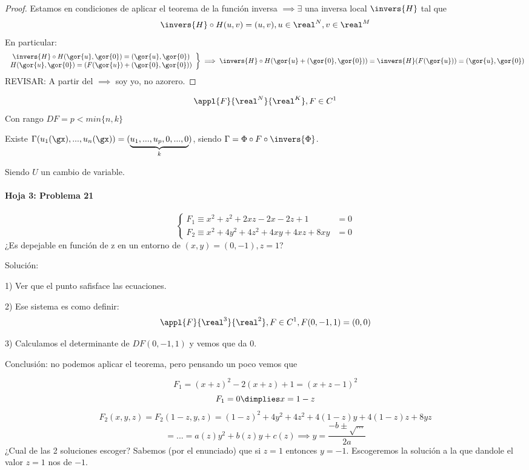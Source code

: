 \begin{proof}
Estamos en condiciones de aplicar el teorema de la función inversa $ \implies \exists$ una inversa local $\invers{H}$ tal que
\[\invers{H} \circ H(u,v) = (u,v), u\in \real^N,v\in\real^M\]
En particular:
\[\left. \begin{array}{c} \invers{H} \circ H (\gor{u},\gor{0}) = (\gor{u},\gor{0})\\
H(\gor{u},\gor{0}) = (F(\gor{u}) + (\gor{0}, \gor{0})) \end{array} \right\} \implies \invers{H} \circ H(\gor{u}+(\gor{0},\gor{0})) = \invers{H}(F(\gor{u})) = (\gor{u},\gor{0})\]
REVISAR: A partir del $\implies$ soy yo, no azorero.
\end{proof}

\begin{theorem}
\[\appl{F}{\real^N}{\real^K}, F\in C^1\]
Con rango $DF = p < min\{n,k\}$

Existe $\Gamma (u_1(\gx),...,u_n(\gx)) = (\underbrace{u_1,...,u_p,0,...,0}_{k})$, siendo $\Gamma = \Phi \circ F \circ \invers{\Phi}$.
 
 Siendo $U$ un cambio de variable.
\end{theorem}

\paragraph{Hoja 3: Problema 21}

\[\left\{\begin{array}{cc}
   F_1\equiv x^2+z^2+2xz-2x-2z+1&=0\\
   F_2\equiv x^2+4y^2+4z^2+4xy+4xz+8xy&=0
  \end{array}\right.\]
  ¿Es depejable en función de z en un entorno de $(x,y) = (0,-1), z=1$?
  
Solución:

1) Ver que el punto safisface las ecuaciones.

2) Ese sistema es como definir:
\[\appl{F}{\real^3}{\real^2}, F\in C^1, F(0,-1,1) = (0,0)\]

3) Calculamos el determinante de $DF(0,-1,1)$ y vemos que da $0$. 

Conclusión: no podemos aplicar el teorema, pero pensando un poco vemos que 

\[F_1 = (x+z)^2 -2(x+z) + 1 = (x+z-1)^2\]
\[F_1 = 0 \dimplies x=1-z\]
\[F_2(x,y,z) = F_2(1-z,y,z) = (1-z)^2 + 4y^2 + 4z^2 + 4(1-z)y + 4(1-z)z+8yz\]
\[ =... = a(z)y^2+b(z)y+c(z) \implies y=\frac{-b\pm \sqrt{...}}{2a}\]
¿Cual de las 2 soluciones escoger? Sabemos (por el enunciado) que si $z=1$ entonces $y=-1$. Escogeremos la solución a la que dandole el valor $z=1$ nos de $-1$.

